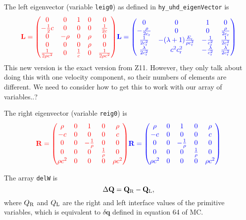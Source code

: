 \documentclass[preprint,11pt]{aastex}
\newcommand{\beq}{\begin{equation}}
\newcommand{\eeq}{\end{equation}}
\begin{document}
{The left eigenvector (variable \verb!leig0!)  as defined in \verb!hy_uhd_eigenVector! is
\beq
{\color{red}
\mathbf{L} = 
\begin{pmatrix}
0 & 0 & 1 & 0 & 0 \\
-\frac{1}{2} c & 0 & 0 & 0 & \frac{1}{2 c} \\
0 & -\rho & 0 & \rho & 0 \\
0 & 0 & 0 & \rho & 0 \\
\frac{1}{2 \rho c^2} & 0 & \frac{1}{c} & 0 & \frac{1}{2 \rho c^2}
\end{pmatrix}
}
{\color{blue}
\mathbf{L} = 
\begin{pmatrix}
0 & 0 & 1 & 0 \\
-\frac{\rho}{2c_{\rm r}}  & 0 & 0 & \frac{\rho}{2 c_{\rm r}} \\
\frac{1}{2 c_{\rm r}^2}& -(\lambda + 1) \frac{E_{\rm r}}{\rho c_{\rm r}^2}& -\frac{1}{c_{\rm r}^2}&\frac{1}{2c_{\rm r}^2} \\
\frac{\lambda}{2 c_{\rm r}^2}& c^2 c_{\rm r}^2& -\frac{\lambda}{c_{\rm r}^2}&\frac{\lambda}{2 c_{\rm r}^2}
\end{pmatrix}
}
\eeq
{\color{blue} This new version is the exact version from Z11.  However, they only talk about doing this with one velocity component, so their numbers of elements are different.  We need to consider how to get this to work with our array of variables..?}

The right eigenvector (variable \verb!reig0!) is
\beq
{\color{red}
\mathbf{R} = 
\begin{pmatrix}
\rho & 0 & 1 & 0 & \rho \\
-c & 0 & 0 & 0 & c \\
0 & 0 & -\frac{1}{\rho} & 0 & 0 \\
0 & 0 & 0 & \frac{1}{\rho} & 0 \\
\rho c^2 & 0 & 0 & 0 & \rho c^2
\end{pmatrix}
}
{\color{blue}
\mathbf{R} = 
\begin{pmatrix}
\rho & 0 & 1 & 0 & \rho \\
-c & 0 & 0 & 0 & c \\
0 & 0 & -\frac{1}{\rho} & 0 & 0 \\
0 & 0 & 0 & \frac{1}{\rho} & 0 \\
\rho c^2 & 0 & 0 & 0 & \rho c^2
\end{pmatrix}
}

\eeq

The array \verb!delW! is
\beq
\Delta \mathbf{Q} = \mathbf{Q}_{\rm R} - \mathbf{Q}_{\rm L},
\eeq
where $Q_{\rm R}$ and $Q_{\rm L}$ are the right and left interface values of the primitive variables, which is equivalent to $\delta \mathbf{q}$ defined in equation 64 of MC.

}
\end{document}
